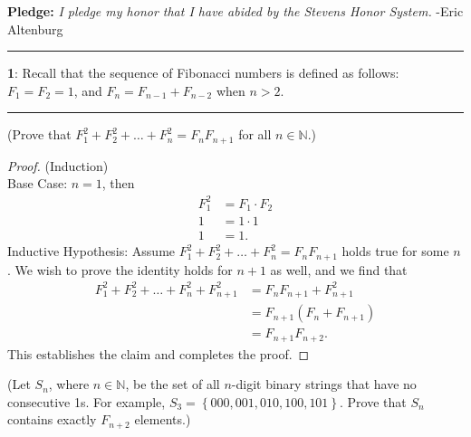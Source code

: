 \documentclass[11pt]{article}
\newcommand\question[2]{\vspace{.25in}\hrule\textbf{#1}: #2\vspace{.5em}\hrule\vspace{.10in}}
\renewcommand\part[1]{\vspace{.10in}(#1)\par}
\newcommand{\N}{\mathbb{N}}
\begin{document}
\raggedright
\newcommand\NAME{Eric Altenburg}  %
\newcommand\COURSE{MA-240}
\newcommand\HWNUM{4 Corrections}              %


\textbf{Pledge:} \textit{I pledge my honor that I have abided by the Stevens Honor System.} -Eric Altenburg

\question{1}{Recall that the sequence of Fibonacci numbers is defined as follows: $F_1 = F_2 = 1$, and $F_n = F_{n-1}+F_{n-2}$ when $n > 2$.}

\part{Prove that $F_1^2+F_2^2+ \ldots + F_n^2 = F_nF_{n+1}$ for all $n \in \N$.}
	\begin{proof}
		(Induction)\\
		Base Case: $n = 1$, then
		\begin{align*}
			F_1^2 &= F_1 \cdot F_{2}\\
			1 &= 1 \cdot 1\\
			1 &= 1.
		\end{align*}
		Inductive Hypothesis: Assume $F_1^2+F_2^2+ \ldots + F_n^2 = F_nF_{n+1}$ holds true for some $n$. We wish to prove the identity holds for $n+1$ as well, and we find that
		\begin{align*}
			F_1^2+F_2^2+ \ldots + F_n^2 + F_{n+1}^2 &= F_nF_{n+1} + F_{n+1}^2\\
			&= F_{n+1} \left(F_n + F_{n+1}\right)\\
			&= F_{n+1} F_{n+2}.
		\end{align*}
		This establishes the claim and completes the proof.
	\end{proof}

\part{Let $S_n$, where $n\in \N$, be the set of all $n$-digit binary strings that have no consecutive 1s. For example, $S_3 = \left\{000, 001, 010, 100, 101\right\}.$ Prove that $S_n$ contains exactly $F_{n+2}$ elements.}
\end{document}
